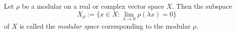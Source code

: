 \documentclass[12pt]{article}
\begin{document}
Let $\rho$ be a modular on a real or complex vector space $X$. Then the subspace
\[
X_\rho := \{x \in X : \lim_{\lambda\rightarrow 0} \rho(\lambda x) = 0\}
\]
of $X$ is called the \emph{modular space} corresponding to the modular $\rho$.


\end{document}
